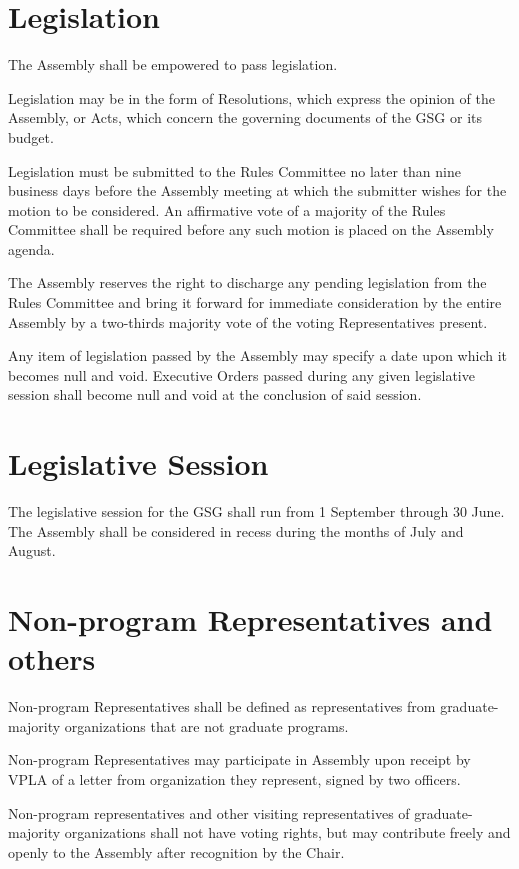 \section{Legislation}
\begin{bylaws-number}
  \item The Assembly shall be empowered to pass legislation.
  \item Legislation may be in the form of Resolutions, which express the opinion of the Assembly, or Acts, which concern the governing documents of the GSG or its budget.
  \item Legislation must be submitted to the Rules Committee no later than nine business days before the Assembly meeting at which the submitter wishes for the motion to be considered. An affirmative vote of a majority of the Rules Committee shall be required before any such motion is placed on the Assembly agenda.
  \item The Assembly reserves the right to discharge any pending legislation from the Rules Committee and bring it forward for immediate consideration by the entire Assembly by a two-thirds majority vote of the voting Representatives present.
  \item Any item of legislation passed by the Assembly may specify a date upon which it becomes null and void. Executive Orders passed during any given legislative session shall become null and void at the conclusion of said session.
\end{bylaws-number}

\section{Legislative Session}
\begin{bylaws-number}
  \item The legislative session for the GSG shall run from 1 September through 30 June. The Assembly shall be considered in recess during the months of July and August.
\end{bylaws-number}

\section{Non-program Representatives and others}
\begin{bylaws-number}
  \item Non-program Representatives shall be defined as representatives from graduate-majority organizations that are not graduate programs.
  \item Non-program Representatives may participate in Assembly upon receipt by VPLA of a letter from organization they represent, signed by two officers.
  \item Non-program representatives and other visiting representatives of graduate-majority organizations shall not have voting rights, but may contribute freely and openly to the Assembly after recognition by the Chair.
\end{bylaws-number}

